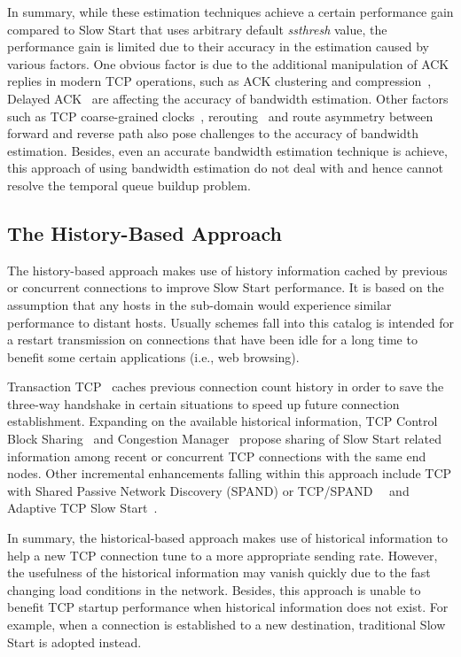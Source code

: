 \documentclass[12pt,onecolumn]{IEEEtran}
\begin{document}
In summary, while these estimation techniques achieve a certain performance
gain compared to Slow Start that uses arbitrary default \emph{ssthresh} value,
the performance gain is limited due to their accuracy in the estimation caused
by various factors. One obvious factor is due to the additional manipulation of
ACK replies in modern TCP operations, such as ACK clustering and
compression~\cite{CA1,compassion}, Delayed ACK~\cite{DACK} are affecting the
accuracy of bandwidth estimation. Other factors such as TCP coarse-grained
clocks~\cite{clock2}, rerouting~\cite{rerouting} and route asymmetry
between forward and reverse path also pose challenges to the accuracy of
bandwidth estimation. Besides, even an accurate bandwidth estimation technique
is achieve, this approach of using bandwidth estimation do not deal with and
hence cannot resolve the temporal queue buildup problem.




\subsection{The History-Based Approach}

The history-based approach makes use of history information cached by previous
or concurrent connections to improve Slow Start performance. It is based on the
assumption that any hosts in the sub-domain would experience similar
performance to distant hosts. Usually schemes fall into this catalog is
intended for a restart transmission on connections that have been idle for a
long time to benefit some certain applications (i.e., web browsing).


Transaction TCP~\cite{transactions1, transactions2} caches previous connection
count history in order to save the three-way handshake in certain situations to
speed up future connection establishment. Expanding on the available historical
information, TCP Control Block Sharing~\cite{interdependence} and Congestion
Manager~\cite{manager} propose sharing of Slow Start related information among
recent or concurrent TCP connections with the same end nodes. Other incremental
enhancements falling within this approach include TCP with Shared Passive
Network Discovery (SPAND) or TCP/SPAND~\cite{spand}~\cite{optimizating1} and Adaptive TCP Slow
Start~\cite{adaptivetcp}.


In summary, the historical-based approach makes use of historical information
to help a new TCP connection tune to a more appropriate sending rate. However, the
usefulness of the historical information may vanish quickly due to the fast
changing load conditions in the network. Besides, this approach is unable to
benefit TCP startup performance when historical information does not exist. For
example, when a connection is established to a new destination, traditional
Slow Start is adopted instead.
\end{document}
